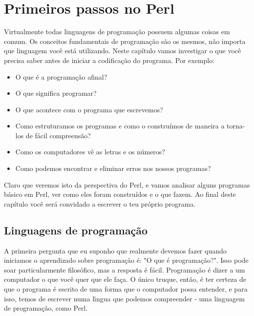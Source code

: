 \documentclass[a4paper,11pt]{book}
\begin{document}
\chapter{Primeiros passos no Perl}

\noindent Virtualmente todas linguagens de programa\c{c}\~ao possuem algumas coisas em comum. Os conceitos fundamentais de programa\c{c}\~ao s\~ao os mesmos, n\~ao importa que linguagem voc\^e est\'a utilizando. Neste cap\'itulo vamos investigar o que voc\^e precisa saber antes de iniciar a codifica\c{c}\~ao do programa. Por exemplo:

\begin{itemize}

 \item O que \'e a programa\c{c}\~ao afinal? 

 \item O que significa programar?

 \item O que acontece com o programa que escrevemos?

 \item Como estruturamos os programas e como o constru\'imos de maneira a torna-los de f\'acil compreens\~ao?

 \item Como os computadores v\^e as letras e os n\'umeros?

 \item Como podemos encontrar e eliminar erros nos nossos programas? 

\end{itemize}

\noindent Claro que veremos isto da perspectiva do Perl, e vamos analisar alguns programas b\'asico em Perl, ver como eles foram constru\'idos e o que fazem. Ao final deste cap\'itulo voc\^e ser\'a convidado a escrever o teu pr\'oprio programa.

\section{Linguagens de programa\c{c}\~ao}

\noindent A primeira pergunta que eu suponho que realmente devemos fazer quando iniciamos o aprendizado sobre programa\c{c}\~ao \'e: "O que \'e programa\c{c}\~ao?". Isso pode soar particularmente filos\'ofico, mas a resposta \'e f\'acil. Programa\c{c}\~ao \'e dizer a um computador o que voc\^e quer que ele fa\c{c}a. O \'unico truque, ent\~ao, \'e ter certeza de que o programa \'e escrito de uma forma que o computador possa entender, e para isso, temos de escrever numa l\'{\i}ngua que podemos compreender - uma linguagem de programa\c{c}\~ao, como Perl.
\end{document}
